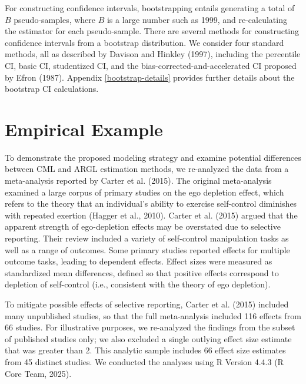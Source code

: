 \documentclass[
  american,
  man, donotrepeattitle,floatsintext]{apa7}
\begin{document}
For constructing confidence intervals, bootstrapping entails generating a total of \(B\) pseudo-samples, where \(B\) is a large number such as 1999, and re-calculating the estimator for each pseudo-sample.
There are several methods for constructing confidence intervals from a bootstrap distribution.
We consider four standard methods, all as described by Davison and Hinkley (1997), including the percentile CI, basic CI, studentized CI, and the bias-corrected-and-accelerated CI proposed by Efron (1987).
Appendix \ref{bootstrap-details} provides further details about the bootstrap CI calculations.

\section{Empirical Example}\label{empirical-example}

To demonstrate the proposed modeling strategy and examine potential differences between CML and ARGL estimation methods, we re-analyzed the data from a meta-analysis reported by Carter et al. (2015).
The original meta-analysis examined a large corpus of primary studies on the ego depletion effect, which refers to the theory that an individual's ability to exercise self-control diminishes with repeated exertion (Hagger et al., 2010).
Carter et al. (2015) argued that the apparent strength of ego-depletion effects may be overstated due to selective reporting.
Their review included a variety of self-control manipulation tasks as well as a range of outcomes.
Some primary studies reported effects for multiple outcome tasks, leading to dependent effects.
Effect sizes were measured as standardized mean differences, defined so that positive effects correspond to depletion of self-control (i.e., consistent with the theory of ego depletion).

To mitigate possible effects of selective reporting, Carter et al. (2015) included many unpublished studies, so that the full meta-analysis included 116 effects from 66 studies.
For illustrative purposes, we re-analyzed the findings from the subset of published studies only; we also excluded a single outlying effect size estimate that was greater than 2. This analytic sample includes 66 effect size estimates from 45 distinct studies.
We conducted the analyses using R Version 4.4.3 (R Core Team, 2025).
\end{document}

